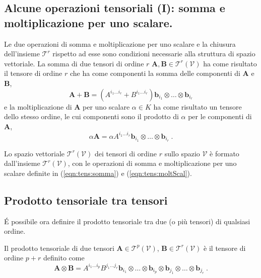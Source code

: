  \subsection{Alcune operazioni tensoriali (I): somma e moltiplicazione per uno scalare.}\label{ch:tensori:operazioniI}
 Le due operazioni di somma e moltiplicazione per uno scalare e la chiusura dell'insieme $\mathcal{T}^r$ rispetto ad esse sono condizioni necessarie alla struttura di spazio vettoriale. La somma di due tensori di ordine $r$ $\bm{A},\bm{B} \in \mathcal{T}^r(\mathcal{V})$ ha come risultato il tensore di ordine $r$ che ha come componenti la somma delle componenti di $\bm{A}$ e $\bm{B}$,
\begin{equation}\label{eqn:tens:somma}
 \bm{A}+\bm{B} = 
    ( A^{i_1 \dots i_r} + B^{i_1 \dots i_r}  ) \bm{b}_{i_1} \otimes \dots \otimes \bm{b}_{i_r}
\end{equation}
 e la moltiplicazione di $\bm{A}$ per uno scalare $\alpha \in K$ ha come risultato un tensore dello stesso ordine, le cui componenti sono il prodotto di $\alpha$ per le componenti di $\bm{A}$, 
\begin{equation}\label{eqn:tens:moltScal}
  \alpha \bm{A} = 
    \alpha A^{i_1 \dots i_r} \bm{b}_{i_1} \otimes \dots \otimes \bm{b}_{i_r} \ .
\end{equation}
%
\vspace{15pt}
\begin{definition} Lo spazio vettoriale $\mathcal{T}^r(\mathcal{V})$ dei tensori di ordine $r$ sullo spazio $\mathcal{V}$ è formato dall'insieme $\mathcal{T}^r(\mathcal{V})$, con le operazioni di somma e moltiplicazione per uno scalare definite in (\ref{eqn:tens:somma}) e (\ref{eqn:tens:moltScal}).
\end{definition}

\subsection{Prodotto tensoriale tra tensori}
\'E possibile ora definire il prodotto tensoriale tra due (o più tensori) di qualsiasi ordine.
\begin{definition}
 Il prodotto tensoriale di due tensori $\bm{A} \in \mathcal{T}^p(\mathcal{V})$, $\bm{B} \in \mathcal{T}^r(\mathcal{V})$ è il tensore di ordine $p+r$ definito come
\begin{equation}
 \bm{A}\otimes\bm{B} = 
   A^{i_1 \dots i_p} B^{j_1 \dots j_r} \bm{b}_{i_1} \otimes \dots \otimes \bm{b}_{i_p}
    \otimes \bm{b}_{j_1} \otimes \dots \otimes \bm{b}_{j_r} \ .
\end{equation}
\end{definition}

